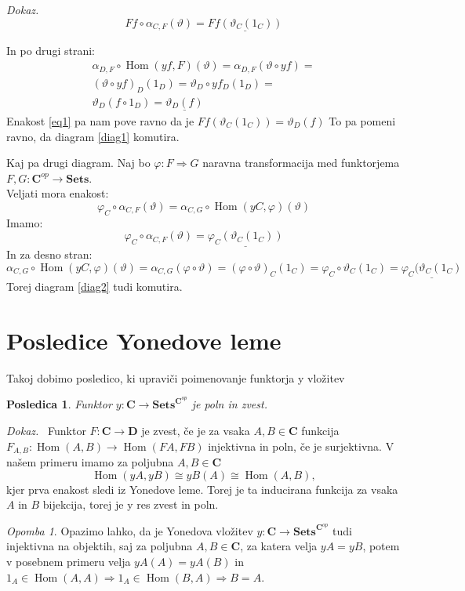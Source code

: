 \documentclass[12pt,a4paper]{book}
\theoremstyle{definition}
\theoremstyle{plain}
\newtheorem{posledica}{Posledica}[definicija]
\newenvironment{dokaz}{\emph{Dokaz.}\ }{\hspace{\fill}{$\Box$}}
\theoremstyle{definition}
\theoremstyle{remark}
\newtheorem*{opomba}{Opomba}
\newcommand{\cat}[1]{\textbf{#1}}
\DeclareMathOperator{\Hom}{Hom}
\begin{document}
\begin{dokaz}
$$Ff \circ \alpha_{C,F}(\vartheta) = \underline{Ff(\vartheta_C(1_C))}$$

In po drugi strani:
\begin{align*}
\alpha_{D,F} \circ \Hom(yf,F)(\vartheta) = \alpha_{D,F}(\vartheta \circ yf) = \\
(\vartheta \circ yf)_D (1_D) = \vartheta_D \circ yf_D(1_D) = \\
\vartheta_D(f \circ 1_D) = \underline{\vartheta_D(f)}
\end{align*}
Enakost \ref{eq1} pa nam pove ravno da je $Ff(\vartheta_C(1_C)) = \vartheta_D(f)$
To pa pomeni ravno, da diagram \ref{diag1} komutira.

Kaj pa drugi diagram. Naj bo $\varphi : F \Rightarrow G$ naravna transformacija med funktorjema $F,G : \cat{C}^{op} \to \cat{Sets}$. \\
Veljati mora enakost:
$$\varphi_C \circ \alpha_{C,F}(\vartheta) = \alpha_{C,G} \circ \Hom(yC,\varphi)(\vartheta)$$
Imamo:
$$\varphi_C \circ \alpha_{C,F}(\vartheta) = \underline{\varphi_C(\vartheta_C(1_C))}$$
In za desno stran:
$$\alpha_{C,G} \circ \Hom(yC,\varphi)(\vartheta) = \alpha_{C,G}(\varphi \circ \vartheta) = 
(\varphi \circ \vartheta)_C(1_C) = \varphi_C \circ \vartheta_C(1_C) = \underline{\varphi_C(\vartheta_C(1_C)}$$
Torej diagram \ref{diag2} tudi komutira.

\end{dokaz}

\section{Posledice Yonedove leme}

Takoj dobimo posledico, ki upraviči poimenovanje funktorja y vložitev
\begin{posledica} Funktor $y : \cat{C} \to \cat{Sets}^{\cat{C}^{op}}$ je poln in zvest.
\end{posledica}
\begin{dokaz}
Funktor $F:\cat{C} \to \cat{D}$ je zvest, če je za vsaka $A,B \in \cat{C}$ funkcija $F_{A,B} : \Hom(A,B) \to \Hom(FA,FB)$ injektivna in poln, če je surjektivna.
V našem primeru imamo za poljubna $A,B \in \cat{C}$ 
$$\Hom(yA,yB) \cong yB(A) \cong \Hom(A,B),$$
kjer prva enakost sledi iz Yonedove leme. Torej je ta inducirana funkcija za vsaka $A$ in $B$ bijekcija, torej je y res zvest in poln.
\end{dokaz}
\begin{opomba}
Opazimo lahko, da je Yonedova vložitev $y : \cat{C} \to \cat{Sets}^{\cat{C}^{op}}$ tudi injektivna na objektih, saj za poljubna $A,B \in \cat{C}$, za katera velja $yA = yB$, potem v posebnem primeru velja $yA(A) = yA(B)$ in $1_A \in \Hom(A,A) \Rightarrow 1_A \in \Hom(B,A) \Rightarrow B = A$.
\end{opomba}
\end{document}
